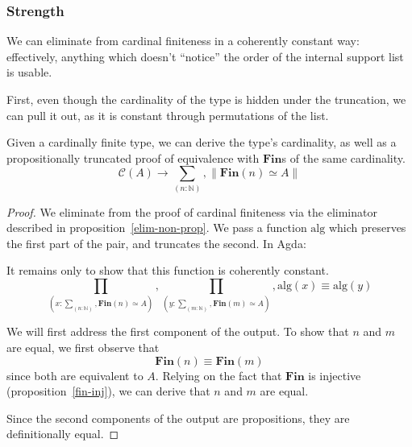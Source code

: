 \subsubsection{Strength}
We can eliminate from cardinal finiteness in a coherently constant way:
effectively, anything which doesn't ``notice'' the order of the internal support
list is usable.

First, even though the cardinality of the type is hidden under the truncation,
we can pull it out, as it is constant through permutations of the list.
\begin{theorem}
  Given a cardinally finite type, we can derive the type's cardinality, as well
  as a propositionally truncated proof of equivalence with \(\textbf{Fin}\)s of
  the same cardinality.
  \begin{equation}
    \mathcal{C}(A) \rightarrow \sum_{(n : \mathbb{N})} , \lVert \textbf{Fin}(n) \simeq A \rVert
  \end{equation}
\end{theorem}
\begin{proof}
  We eliminate from the proof of cardinal finiteness via the eliminator
  described in proposition~\ref{elim-non-prop}.
  We pass a function \(\text{alg}\) which preserves the first part of the pair,
  and truncates the second.
  In Agda:

  It remains only to show that this function is coherently constant.
  \begin{equation}
    \prod_{(x : \sum_{(n : \mathbb{N})} , \textbf{Fin}(n) \simeq A)} ,
    \prod_{(y : \sum_{(m : \mathbb{N})} , \textbf{Fin}(m) \simeq A)} ,
    \text{alg}(x) \equiv \text{alg}(y)
  \end{equation}

  We will first address the first component of the output.
  To show that \(n\) and \(m\) are equal, we first observe that
  \begin{equation}
    \textbf{Fin}(n) \equiv \textbf{Fin}(m)
  \end{equation}
  since both are equivalent to \(A\).
  Relying on the fact that \(\textbf{Fin}\) is injective
  (proposition~\ref{fin-inj}), we can derive that \(n\) and \(m\) are equal.

  Since the second components of the output are propositions, they are
  definitionally equal.
\end{proof}

